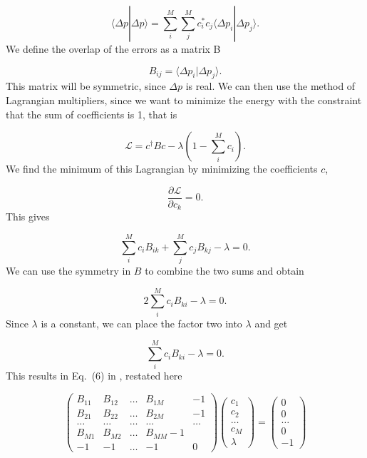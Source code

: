 \documentclass[a4paper,norsk,11pt,twoside]{report}
\begin{document}
\begin{equation}
\langle \Delta p | \Delta p \rangle = \sum_i^M \sum_j^M c_i^* c_j \langle \Delta p_i | \Delta p_j \rangle .
\end{equation}
We define the overlap of the errors as a matrix B

\begin{equation}
B_{ij} = \langle \Delta p_i | \Delta p_j \rangle .
\end{equation}
This matrix will be symmetric, since $\Delta p$ is real. We can then use the method of Lagrangian multipliers, since we want to minimize the energy with the constraint that the sum of coefficients is 1, that is

\begin{equation}
\mathcal{L} = c^{\dag} B c - \lambda \left( 1 - \sum_i^M c_i \right) .
\end{equation}
We find the minimum of this Lagrangian by minimizing the coefficients $c$,

\begin{equation}
\frac{\partial \mathcal{L}}{\partial c_k} = 0 .
\end{equation} 
This gives

\begin{equation}
\sum_i^M c_i B_{ik} + \sum_j^M c_j B_{kj} - \lambda = 0 .
\end{equation}
We can use the symmetry in $B$ to combine the two sums and obtain

\begin{equation}
2 \sum_i^M c_i B_{ki} - \lambda = 0 .
\end{equation}
Since $\lambda$ is a constant, we can place the factor two into $\lambda$ and get

\begin{equation}
\sum_i^M c_i B_{ki} - \lambda = 0 .
\end{equation}
This results in  Eq.~(6) in \cite{diis_citation2}, restated here

\[ \left( \begin{array}{ccccc}
B_{11} & B_{12} & \dots & B_{1M} & -1 \\
B_{21} & B_{22} & \dots & B_{2M} & -1 \\
\dots & \dots & \dots & \dots & \dots \\
B_{M1} & B_{M2} & \dots & B_{MM} -1 \\
-1 & -1 & \dots & -1 & 0
\end{array} \right) \left( \begin{array}{c}
c_1 \\
c_2 \\
\dots \\
c_M \\
\lambda
\end{array} \right) =\left( \begin{array}{c}
0 \\
0 \\
\dots \\
0 \\
-1 
\end{array} \right)\] 
\end{document}
